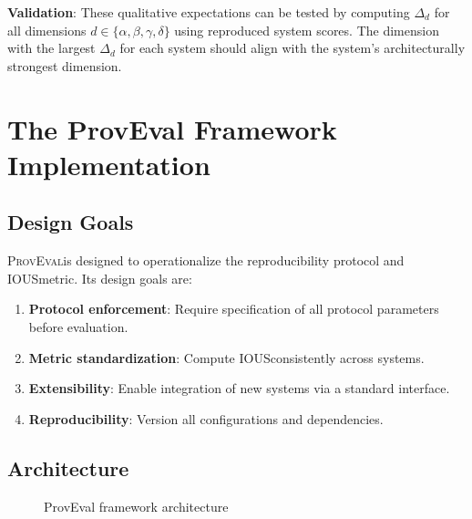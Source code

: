 \documentclass[11pt,a4paper]{article}
\newcommand{\ious}{\textsc{IOUS}}
\newcommand{\proveval}{\textsc{ProvEval}}
\begin{document}
\textbf{Validation}: These qualitative expectations can be tested by computing $\Delta_d$ for all dimensions $d \in \{\alpha, \beta, \gamma, \delta\}$ using reproduced system scores. The dimension with the largest $\Delta_d$ for each system should align with the system's architecturally strongest dimension.

\section{The ProvEval Framework Implementation}
\label{sec:proveval}

\subsection{Design Goals}

\proveval is designed to operationalize the reproducibility protocol and \ious metric. Its design goals are:
\begin{enumerate}[leftmargin=*]
    \item \textbf{Protocol enforcement}: Require specification of all protocol parameters before evaluation.
    \item \textbf{Metric standardization}: Compute \ious consistently across systems.
    \item \textbf{Extensibility}: Enable integration of new systems via a standard interface.
    \item \textbf{Reproducibility}: Version all configurations and dependencies.
\end{enumerate}

\subsection{Architecture}

\begin{figure}[H]
\centering
{}
\caption{ProvEval framework architecture}
\label{fig:proveval}
\end{figure}
\end{document}

